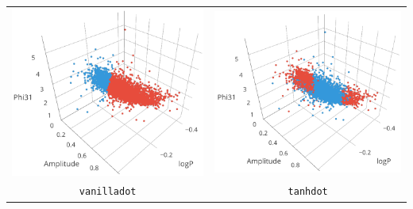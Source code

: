 \begin{longtable}{ c c }
	\includegraphics[width=0.3\paperwidth]{images/ksvm_vanilladot.png} & \includegraphics[width=0.3\paperwidth]{images/ksvm_tanhdot.png} \\
	\verb|vanilladot| & \verb|tanhdot| \\

\end{longtable}

